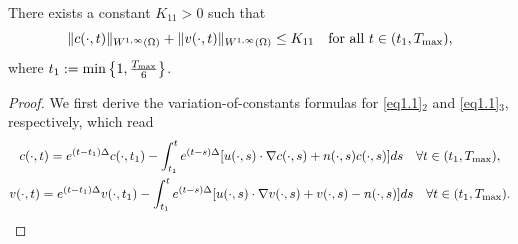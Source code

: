 \documentclass[reqno]{amsart}
\begin{document}
\begin{lemma}\label{lem3.10}
There exists a constant $K_{11}> 0$ such that
\begin{equation}\label{(3.70)}
\| c(\cdot, t) \|_{W^{1,\infty}(\Omega)} + \| v(\cdot, t) \|_{W^{1,\infty}(\Omega)}
  \leq K_{11} \quad \text{for all } t \in (t_1, T_{\rm max}),
\end{equation}
where $t_1:=\min\left\{1,\frac{T_{\rm max}}{6}\right\}$.
\end{lemma}

\begin{proof} 
We first derive the variation-of-constants formulas for \eqref{eq1.1}$_2$ and 
\eqref{eq1.1}$_3$, respectively, which read
\begin{gather}\label{9.13-12}
c(\cdot, t) = e^{(t-t_1)\Delta} c(\cdot, t_1)- \int_{t_1}^t
 e^{(t - s)\Delta} [ u(\cdot, s) \cdot \nabla c(\cdot, s) + n(\cdot, s)c(\cdot, s) ] ds 
 \quad \forall t \in (t_1, T_{\rm max}), \\
\label{9.13-22}
v(\cdot, t) = e^{(t-t_1)\Delta} v(\cdot, t_1) - \int_{t_1}^t e^{(t - s)\Delta} 
[ u(\cdot, s) \cdot \nabla v(\cdot, s) + v(\cdot, s) - n(\cdot, s) ] ds \quad 
\forall  t \in (t_1, T_{\rm max}).
\end{gather}


\end{proof}
\end{document}
